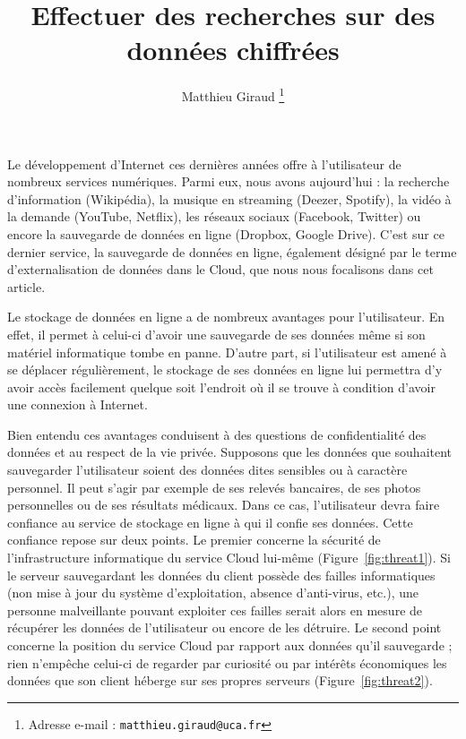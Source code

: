 \documentclass[french]{article}
\author{Matthieu Giraud%
\thanks{Adresse e-mail : \texttt{matthieu.giraud@uca.fr}}}
\date{}
\title{Effectuer des recherches sur des données chiffrées}
\affil{\textsc{limos}, Université Clermont Auvergne}
\begin{document}
\maketitle

Le développement d'Internet ces dernières années offre à l'utilisateur
de nombreux services numériques. Parmi eux, nous avons aujourd'hui :
la recherche d'information (Wikipédia), la musique en streaming
(Deezer, Spotify), la vidéo à la demande (YouTube, Netflix), les
réseaux sociaux (Facebook, Twitter) ou encore la sauvegarde de données
en ligne (Dropbox, Google Drive). C'est sur ce dernier service, la
sauvegarde de données en ligne, également désigné par le terme
d'externalisation de données dans le Cloud, que nous nous focalisons
dans cet article.

Le stockage de données en ligne a de nombreux avantages pour
l'utilisateur.  En effet, il permet à celui-ci d'avoir une sauvegarde
de ses données même si son matériel informatique tombe en
panne. D'autre part, si l'utilisateur est amené à se déplacer
régulièrement, le stockage de ses données en ligne lui permettra d'y
avoir accès facilement quelque soit l'endroit où il se trouve à
condition d'avoir une connexion à Internet.

Bien entendu ces avantages conduisent à des questions de
confidentialité des données et au respect de la vie privée. Supposons
que les données que souhaitent sauvegarder l'utilisateur soient des
données dites sensibles ou à caractère personnel. Il peut s'agir par
exemple de ses relevés bancaires, de ses photos personnelles ou de ses
résultats médicaux. Dans ce cas, l'utilisateur devra faire confiance
au service de stockage en ligne à qui il confie ses données. Cette
confiance repose sur deux points. Le premier concerne la sécurité de
l'infrastructure informatique du service Cloud lui-même
(Figure~\ref{fig:threat1}). Si le serveur sauvegardant les données du
client possède des failles informatiques (non mise à jour du système
d'exploitation, absence d'anti-virus, etc.), une personne malveillante
pouvant exploiter ces failles serait alors en mesure de récupérer les
données de l'utilisateur ou encore de les détruire. Le second point
concerne la position du service Cloud par rapport aux données qu'il
sauvegarde ; rien n'empêche celui-ci de regarder par curiosité ou par
intérêts économiques les données que son client héberge sur ses
propres serveurs (Figure~\ref{fig:threat2}).
\end{document}
